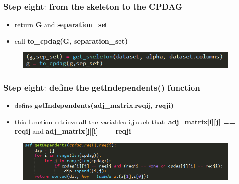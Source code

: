 \documentclass[xcolor ={table,usenames,dvipsnames}]{beamer}
\theoremstyle{definition}
\begin{document}
\begin{frame}
\frametitle{Step eight: from the skeleton to the CPDAG}
\begin{itemize}
	\item return \textbf{G} and \textbf{separation\_set}
	\item call \textbf{to\_cpdag(G, separation\_set)}
\end{itemize}
	\begin{figure}[h!]
		\centering
		\includegraphics[scale=0.75]{img/tocpdag.PNG}
		\label{Interfacce di un CS}
	\end{figure}
\end{frame}

\begin{frame}
\frametitle{Step eight: define the getIndependents() function}
\begin{itemize}
	\item define \textbf{getIndependents(adj\_matrix,reqij, reqji)}
	\item this function retrieve all the variables i,j such that: \textbf{adj\_matrix[i][j] == reqij} and \textbf{adj\_matrix[j][i] == reqji}
\end{itemize}
	\begin{figure}[h!]
		\centering
		\includegraphics[scale=0.57]{img/getindep.PNG}
		\label{Interfacce di un CS}
	\end{figure}
\end{frame}
\end{document}
